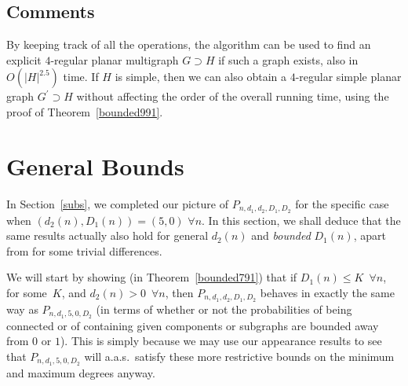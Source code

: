 \documentclass{article}
\newtheorem{Proof of Theorem}{Proof of Theorem}
\begin{document}
\subsection*{Comments}





By keeping track of all the operations,
the algorithm can be used to find an explicit $4$-regular planar multigraph $G \supset H$ if such a graph exists,
also in $O \left( |H|^{2.5} \right)$ time.
If $H$ is simple,
then we can also obtain a $4$-regular simple planar graph $G^{\prime} \supset H$
without affecting the order of the overall running time,
using the proof of Theorem~\ref{bounded991}.













































\newpage
\section{General Bounds} \label{general}















In Section~\ref{subs}, we completed our picture of $P_{n,d_{1},d_{2},D_{1},D_{2}}$
for the specific case when $(d_{2}(n),D_{1}(n))=(5,0)$ $\forall n$.
In this section,
we shall deduce that the same results actually also hold for general $d_{2}(n)$ and \textit{bounded} $D_{1}(n)$,
apart from for some trivial differences.

We will start by showing (in Theorem~\ref{bounded791}) that if 
$D_{1}(n) \leq K$~$\forall n$, for some~$K$, and $d_{2}(n)>0$~$\forall n$,
then $P_{n,d_{1},d_{2},D_{1},D_{2}}$ behaves in exactly the same way as $P_{n,d_{1},5,0,D_{2}}$
(in terms of whether or not the probabilities 
of being connected or of containing given components or subgraphs are bounded away from $0$ or $1$).
This is simply because we may use our appearance results to see that $P_{n,d_{1},5,0,D_{2}}$
will a.a.s.~satisfy these more restrictive bounds on the minimum and maximum degrees anyway.
\end{document}
